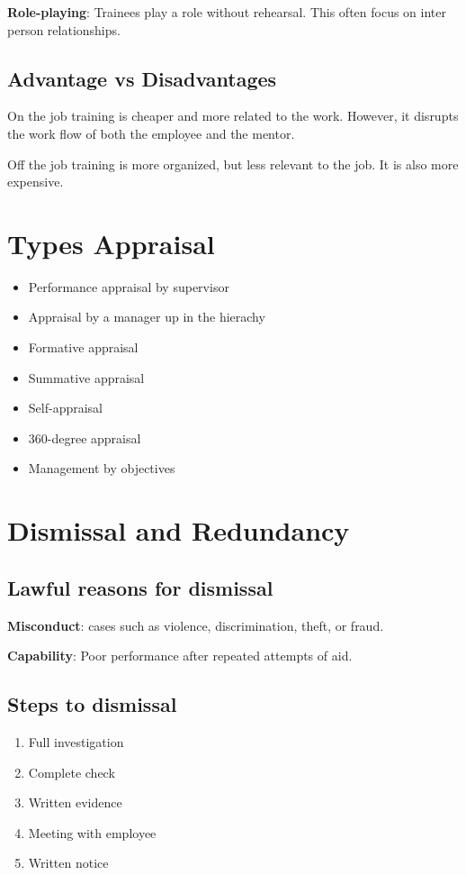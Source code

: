 \documentclass{standalone}
\begin{document}
\textbf{Role-playing}: Trainees play a role without rehearsal. 
This often focus on inter person relationships.

\subsection{Advantage vs Disadvantages}
On the job training is cheaper and more related to the work.
However, it disrupts the work flow of both the employee and the mentor.

Off the job training is more organized, but less relevant to the job.
It is also more expensive.

\section{Types Appraisal}
\begin{itemize}
	\item Performance appraisal by supervisor
	\item Appraisal by a manager up in the hierachy
	\item Formative appraisal
	\item Summative appraisal
	\item Self-appraisal
	\item 360-degree appraisal
	\item Management by objectives
\end{itemize}

\section{Dismissal and Redundancy}

\subsection{Lawful reasons for dismissal}
\textbf{Misconduct}: cases such as violence, discrimination, theft, or fraud.

\textbf{Capability}: Poor performance after repeated attempts of aid.

\subsection{Steps to dismissal}
\begin{enumerate}
	\item Full investigation
	\item Complete check
	\item Written evidence
	\item Meeting with employee
	\item Written notice
\end{enumerate}
\end{document}
